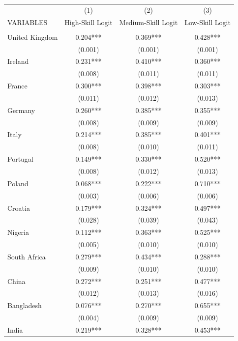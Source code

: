 \documentclass[12pt, a4paper]{article}
\begin{document}
\begin{table}[H]
    \centering
        \begin{tabularx}{\textwidth}{@{}lCCC@{}} \hline
         & (1) & (2) & (3) \\
        VARIABLES & High-Skill Logit & Medium-Skill Logit & Low-Skill Logit \\ \hline
         &  &  &  \\
        United Kingdom & 0.204*** & 0.369*** & 0.428*** \\
         & (0.001) & (0.001) & (0.001) \\
        Ireland & 0.231*** & 0.410*** & 0.360*** \\
         & (0.008) & (0.011) & (0.011) \\
        France & 0.300*** & 0.398*** & 0.303*** \\
         & (0.011) & (0.012) & (0.013) \\
        Germany & 0.260*** & 0.385*** & 0.355*** \\
         & (0.008) & (0.009) & (0.009) \\
        Italy & 0.214*** & 0.385*** & 0.401*** \\
         & (0.008) & (0.010) & (0.011) \\
        Portugal & 0.149*** & 0.330*** & 0.520*** \\
         & (0.008) & (0.012) & (0.013) \\
        Poland & 0.068*** & 0.222*** & 0.710*** \\
         & (0.003) & (0.006) & (0.006) \\
        Croatia & 0.179*** & 0.324*** & 0.497*** \\
         & (0.028) & (0.039) & (0.043) \\
        Nigeria & 0.112*** & 0.363*** & 0.525*** \\
         & (0.005) & (0.010) & (0.010) \\
        South Africa & 0.279*** & 0.434*** & 0.288*** \\
         & (0.009) & (0.010) & (0.010) \\
        China & 0.272*** & 0.251*** & 0.477*** \\
         & (0.012) & (0.013) & (0.016) \\
        Bangladesh & 0.076*** & 0.270*** & 0.655*** \\
         & (0.004) & (0.009) & (0.009) \\
        India & 0.219*** & 0.328*** & 0.453*** \\

\end{tabularx}
\end{table}
\end{document}

